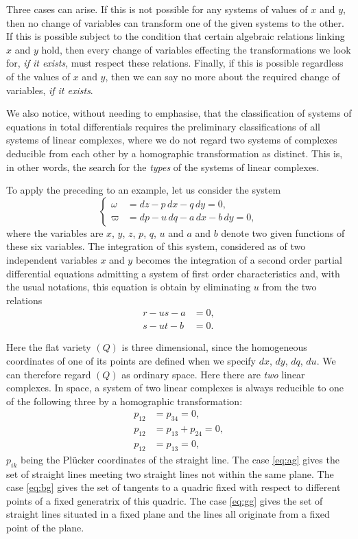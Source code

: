 \documentclass[leqno,11pt]{book}
\theoremstyle{shape1}
\theoremstyle{shapesmall}
\newcommand{\vp}{\varpi}
\begin{document}
Three cases can arise. If this is not possible for any systems of values of $x$ and $y$, then no change of variables can transform one of the given systems to the other. If this is possible subject to the condition that certain algebraic relations linking $x$ and $y$ hold, then every change of variables effecting the transformations we look for, \emph{if it exists}, must respect these relations. Finally, if this is possible regardless of the values of $x$ and $y$, then we can say no more about the required change of variables, \emph{if it exists}.

We also notice, without needing to emphasise, that the classification of systems of equations in total differentials requires the preliminary classifications of all systems of linear complexes, where we do not regard two systems of complexes deducible from each other by a homographic transformation as distinct. This is, in other words, the search for the \emph{types} of the systems of linear complexes.

To apply the preceding to an example, let us consider the system
\begin{equation}
  \label{eq:3}
  \left\{
    \begin{aligned}
      \omega&=dz-p\,dx-q\,dy=0,\\
      \vp&=dp-u\,dq-a\,dx-b\,dy=0,
    \end{aligned}
  \right.
\end{equation}
where the variables are $x$, $y$, $z$, $p$, $q$, $u$ and $a$ and $b$ denote two given functions of these six variables. The integration of this system, considered as of two independent variables $x$ and $y$ becomes the integration of a second order partial differential equations admitting a system of first order characteristics and, with the usual notations, this equation is obtain by eliminating $u$ from the two relations
\begin{align*}
  r-us-a&=0,\\
  s-ut-b&=0.
\end{align*}

Here the flat variety $(Q)$ is three dimensional, since the homogeneous coordinates of one of its points are defined when we specify $dx$, $dy$, $dq$, $du$. We can therefore regard $(Q)$ as ordinary space. Here there are \emph{two} linear complexes. In space, a system of two linear complexes is always reducible to one of the following three by a homographic transformation:
\begin{align}
  \label{eq:ag}\tag{$\alpha$}
  p_{12}&=p_{34}=0,\\
  \label{eq:bg}\tag{$\beta$}
  p_{12}&=p_{13}+p_{24}=0,\\
  \label{eq:gg}\tag{$\gamma$}
  p_{12}&=p_{13}=0,  
\end{align}
$p_{ik}$ being the Plücker coordinates of the straight line. The case \eqref{eq:ag} gives the set of straight lines meeting two straight lines not within the same plane. The case \eqref{eq:bg} gives the set of tangents to a quadric fixed with respect to different points of a fixed generatrix of this quadric. The case \eqref{eq:gg} gives the set of straight lines situated in a fixed plane and the lines all originate from a fixed point of the plane.
\end{document}
